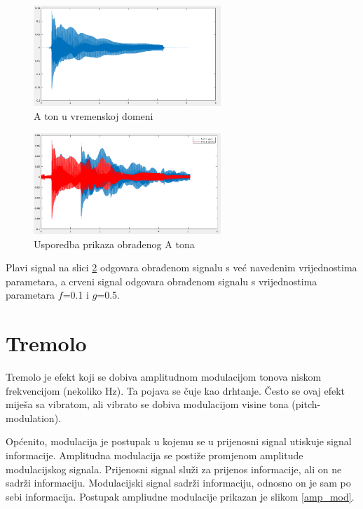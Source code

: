 \documentclass[conference]{IEEEtran}
\begin{document}
\begin{figure}[H]
  \centerline{\includegraphics[width=200pt]{slike/A_ton_vrijeme.png}}
  \caption{A ton u vremenskoj domeni}
  \label{A_ton_vrijeme}
\end{figure}

\begin{figure}[H]
  \centerline{\includegraphics[width=200pt]{slike/A_ton_usporedba.png}}
  \caption{Usporedba prikaza obrađenog A tona}
  \label{A_usporedba}
\end{figure}

Plavi signal na slici \ref{A_usporedba} odgovara obrađenom signalu
s već navedenim vrijednostima parametara, a crveni signal odgovara obrađenom signalu s vrijednostima parametara
$f$=0.1 i $g$=0.5.


\section{Tremolo}
Tremolo je efekt koji se dobiva amplitudnom modulacijom tonova niskom frekvencijom (nekoliko Hz). Ta pojava se čuje
kao drhtanje. Često se ovaj efekt miješa sa vibratom, ali vibrato se dobiva modulacijom visine tona (pitch-modulation).

Općenito, modulacija je postupak u kojemu se u prijenosni signal utiskuje signal informacije. Amplitudna modulacija
se postiže promjenom amplitude modulacijskog signala. Prijenosni signal služi za prijenos informacije, ali on ne
sadrži informaciju. Modulacijski signal sadrži informaciju, odnosno on je sam po sebi informacija. Postupak ampliudne
 modulacije prikazan je slikom \ref{amp_mod}.
\end{document}
